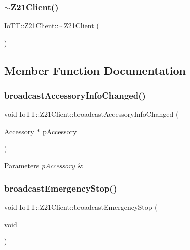 \subsubsection{\texorpdfstring{$\sim$\+Z21\+Client()}{~Z21Client()}}
{\footnotesize\ttfamily Io\+T\+T\+::\+Z21\+Client\+::$\sim$\+Z21\+Client (\begin{DoxyParamCaption}{ }\end{DoxyParamCaption})\hspace{0.3cm}{\ttfamily [virtual]}}



\subsection{Member Function Documentation}
\mbox{\label{classIoTT_1_1Z21Client_a735b31947ef82db5bfea9acf07057a10}} 
\subsubsection{\texorpdfstring{broadcast\+Accessory\+Info\+Changed()}{broadcastAccessoryInfoChanged()}}
{\footnotesize\ttfamily void Io\+T\+T\+::\+Z21\+Client\+::broadcast\+Accessory\+Info\+Changed (\begin{DoxyParamCaption}\item[{\hyperlink{classIoTT_1_1Accessory}{Accessory} $\ast$}]{p\+Accessory }\end{DoxyParamCaption})}


\begin{DoxyParams}{Parameters}
{\em p\+Accessory} & \\
\hline
\end{DoxyParams}
\mbox{\label{classIoTT_1_1Z21Client_a2aee3301db3f99972e24894830420d66}} 
\subsubsection{\texorpdfstring{broadcast\+Emergency\+Stop()}{broadcastEmergencyStop()}}
{\footnotesize\ttfamily void Io\+T\+T\+::\+Z21\+Client\+::broadcast\+Emergency\+Stop (\begin{DoxyParamCaption}\item[{void}]{ }\end{DoxyParamCaption})}


